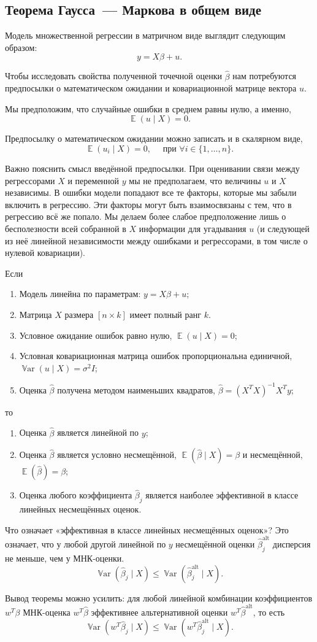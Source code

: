 \documentclass[12pt]{article}
\DeclareMathOperator{\Var}{\mathbb{V}ar}
\DeclareMathOperator{\E}{\mathbb{E}}
\newcommand{\hb}{\hat{\beta}}
\newcommand{\alt}{\text{alt}}
\newcommand{\gaussmarkov}{
\begin{enumerate}[label=\arabic*.]
    \item Модель линейна по параметрам: $y = X\beta + u$;
    \item Матрица $X$ размера $[n \times k]$ имеет полный ранг $k$.
    \item Условное ожидание ошибок равно нулю, $\E(u\mid X) = 0$;
    \item Условная ковариационная матрица ошибок пропорциональна единичной, $\Var(u\mid X) = \sigma^2 I$;
    \item Оценка $\hb$ получена методом наименьших квадратов, $\hb = (X^T X)^{-1}X^T y$;
\end{enumerate}}
\begin{document}
\subsection{Теорема Гаусса~— Маркова в общем виде}

Модель множественной регрессии в матричном виде выглядит следующим образом:
\[y = X\beta + u.\]

Чтобы исследовать свойства полученной точечной оценки $\hb$ нам потребуются предпосылки о математическом ожидании и ковариационной матрице вектора $u$.

Мы предположим, что случайные ошибки в среднем равны нулю, а именно,
\[
\E(u \mid X) = 0.
\]

Предпосылку о математическом ожидании можно записать и в скалярном виде,
\[
\E(u_i \mid X) = 0, \quad \text{ при } \forall i \in \{1, \dots, n\}.
\]

Важно пояснить смысл введённой предпосылки. При оценивании связи между регрессорами $X$ и переменной $y$ мы не предполагаем, что величины $u$ и $X$ независимы. В ошибки модели попадают все те факторы, которые мы забыли включить в регрессию. Эти факторы могут быть взаимосвязаны с тем, что в регрессию всё же попало. Мы делаем более слабое предположение лишь о бесполезности всей собранной в $X$ информации для угадывания $u$ (и следующей из неё линейной независимости между ошибками и регрессорами, в том числе о нулевой ковариации).

\begin{theorem}
Если 
\gaussmarkov
то
\begin{enumerate}[label=(\alph*)]
    \item Оценка $\hb$ является линейной по $y$;
    \item Оценка $\hb$ является условно несмещённой, $\E(\hb \mid X) = \beta$ и несмещённой, $\E(\hb) = \beta$;
    \item Оценка любого коэффициента $\hb_j$ является наиболее эффективной в классе линейных несмещённых оценок. 
\end{enumerate}
\end{theorem}

Что означает «эффективная в классе линейных несмещённых оценок»?
Это означает, что у любой другой линейной по $y$ несмещённой оценки $\hb^{\alt}_j$ дисперсия не меньше, чем у МНК-оценки.
\[
\Var(\hb_j \mid X) \leq \Var(\hb^{\alt}_j \mid X).
\]

Вывод теоремы можно усилить: для любой линейной комбинации коэффициентов $w^T \beta$ МНК-оценка $w^T \hb$ эффективнее альтернативной оценки $w^T \hb^{\alt}$, то есть
\[
\Var(w^T\hb_j \mid X) \leq \Var(w^T \hb^{\alt}_j \mid X).
\]
\end{document}
